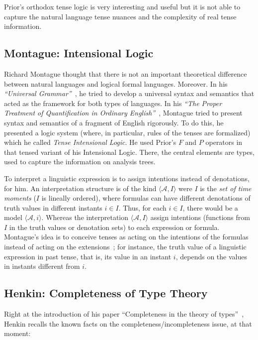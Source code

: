Prior's orthodox tense logic is very interesting and useful but it is not
able to capture the natural language tense nuances and the complexity of
real tense information.

\subsection{Montague: Intensional Logic}

Richard Montague thought that there is not an important theoretical
difference between natural languages and logical formal languages. Moreover.
In his \emph{``Universal 
Grammar''}~\cite{Montague1970}, he tried to develop a universal syntax and semantics that
acted as the framework for both types of languages. In his
\emph{``The Proper Treatment of Quantification in Ordinary
English''}~\cite{Montague1973}, Montague tried to present
syntax and semantics of a fragment of English rigorously. To do this, he
presented a logic system (where, in particular, rules of the tenses are
formalized) which he called \emph{Tense Intensional Logic}. He used Prior's 
$F$ and $P$ operators in that tensed variant of his Intensional Logic. There,
the central elements are types, used to capture the information on analysis
trees.

To interpret a linguistic expression is to assign intentions instead of
denotations, for him. An interpretation structure is of the kind 
$\langle \mathcal{A},I\rangle$ were $I$ is the \emph{set of
time moments} ($I$ is lineally ordered), where formulas can have different
denotations of truth values in different instants $i\in I$. Thus, for each 
$i\in I$, there would be a model $\langle \mathcal{A},i\rangle$.
Whereas the interpretation $\langle \mathcal{A},I\rangle $ assign
intentions (functions from $I$ in the truth values or denotation sets) to
each expression or formula. Montague's idea is to conceive tenses as acting
on the intentions of the formulas instead of acting on the 
extensions~\cite{Montague1973};  for instance, the truth value of a linguistic expression in
past tense, that is, its value in an instant $i$, depends on the values in
instants different from $i$.

\subsection{Henkin: Completeness of Type Theory}

Right at the introduction of his paper ``Completeness in the
theory of types''~\cite{Henkin1950}, Henkin recalls the
known facts on the completeness/incompleteness issue, at that moment:

